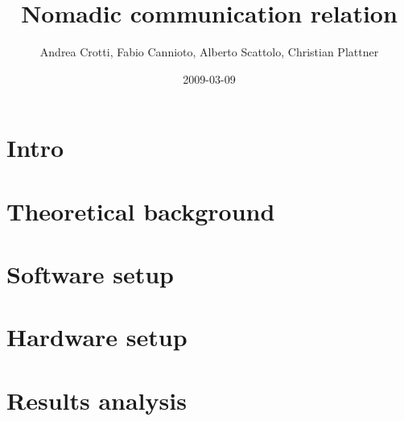\documentclass[]{article}
\title{Nomadic communication relation}
\author{Andrea Crotti, Fabio Cannioto, Alberto Scattolo, Christian Plattner}
\date{2009-03-09}
\begin{document}
\ifpdf
{}
\else
{}
\fi

\maketitle
\lstset{numbers=left, numberstyle=\tiny, language=python}

\section{Intro}


\section{Theoretical background}


\section{Software setup}


\section{Hardware setup}


\section{Results analysis}




\end{document}
